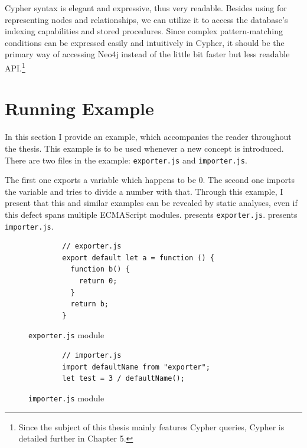 Cypher syntax is elegant and expressive, thus very readable. Besides using for representing nodes and relationships, we can utilize it to access the database's indexing capabilities and stored procedures. Since complex pattern-matching conditions can be expressed easily and intuitively in Cypher, it should be the primary way of accessing Neo4j instead of the little bit faster but less readable API.\footnote{Since the subject of this thesis mainly features Cypher queries, Cypher is detailed further in Chapter 5.}


\section{Running Example}

In this section I provide an example, which accompanies the reader throughout the thesis. This example is to be used whenever a new concept is introduced. There are two files in the example: \texttt{exporter.js} and \texttt{importer.js}.

The first one exports a variable which happens to be 0. The second one imports the variable and tries to divide a number with that. Through this example, I present that this and similar examples can be revealed by static analyses, even if this defect spans multiple ECMAScript modules.  presents \texttt{exporter.js}.  presents \texttt{importer.js}.

\begin{figure}[!htb]
	\centering
	\begin{minipage}{25em}
		\begin{verbatim}
		// exporter.js
		export default let a = function () {
		  function b() {
		    return 0;
		  }
		  return b;
		}
		\end{verbatim}
	\end{minipage}
  \caption{\texttt{exporter.js} module}
  \label{fig:running-example-exporter}
\end{figure}

\begin{figure}[!htb]
	\centering
	\begin{minipage}{25em}
		\begin{verbatim}
		// importer.js
		import defaultName from "exporter";
		let test = 3 / defaultName();
		\end{verbatim}
	\end{minipage}
  \caption{\texttt{importer.js} module}
  \label{fig:running-example-importer}
\end{figure}

